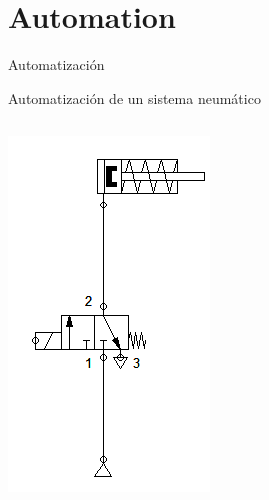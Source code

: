 \documentclass[presentation,aspectratio=169, usenames, dvipsnames]{beamer}
\begin{document}
\section{Automation}
\label{sec:org9cf8b86}
\begin{frame}[label={sec:orgcf6cbb0}]{Automatización}
\end{frame}
\begin{frame}[label={sec:org1137851}]{Automatización de un sistema neumático}
\begin{columns}
\begin{column}{0.3\columnwidth}
\begin{center}
 \includegraphics[width=1.0\linewidth]{../figures/fluidsim-32-solenoid-cylinder.png}
\end{center}
\end{column}
\begin{column}{0.6\columnwidth}
\pause


\end{column}
\end{columns}
\end{frame}
\end{document}
